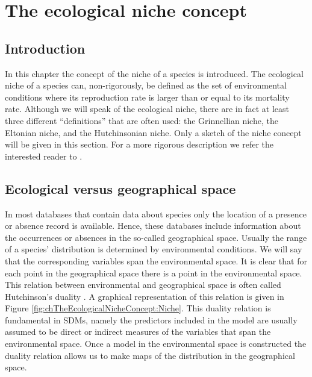 \chapter{The ecological niche concept}
\label{ch:TheEcologicalNicheConcept}
\section{Introduction}
\label{sec:chTheEcologicalNicheConcept:Introduction}
In this chapter the concept of the niche of a species is introduced. The ecological niche of a species can, non-rigorously, be defined as the set of environmental conditions where its reproduction rate is larger than or equal to its mortality rate. Although we will speak of the ecological niche, there are in fact at least three different ``definitions'' that are often used: the Grinnellian niche, the Eltonian niche, and the Hutchinsonian niche. Only a sketch of the niche concept will be given in this section. For a more rigorous description we refer the interested reader to \cite{soberon_grinnellian_2007, soberon_niches_2009}.

\section{Ecological versus geographical space}
In most databases that contain data about species only the location of a presence or absence record is available. Hence, these databases include information about the occurrences or absences in the so-called geographical space. Usually the range of a species' distribution is determined by environmental conditions. We will say that the corresponding variables span the environmental space. It is clear that for each point in the geographical space there is a point in the environmental space. This relation between environmental and geographical space is often called Hutchinson's duality \parencite{colwell_hutchinsons_2009}. A graphical representation of this relation is given in Figure \ref{fig:chTheEcologicalNicheConcept:Niche}. This duality relation is fundamental in SDMs, namely the predictors included in the model are usually assumed to be direct or indirect measures of the variables that span the environmental space. Once a model in the environmental space is constructed the duality relation allows us to make maps of the distribution in the geographical space. \\

